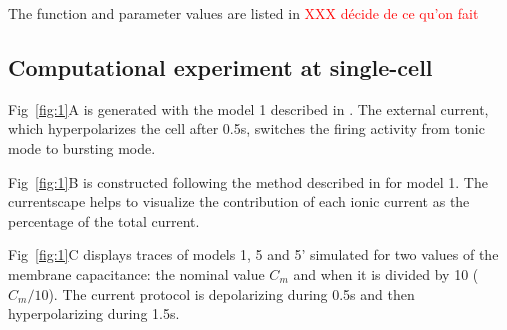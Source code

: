 The function and parameter values are listed in \textcolor{red}{XXX décide de ce qu'on fait}


\subsection{Computational experiment at single-cell}
Fig~\ref{fig:1}A is generated with the model 1 described in \citep{drion_switchable_2018}. The external current, which hyperpolarizes the cell after 0.5s, switches the firing activity from tonic mode to bursting mode. 

Fig~\ref{fig:1}B is constructed following the method described in \citep{alonso_visualization_2019} for model 1. The currentscape helps to visualize the contribution of each ionic current as the percentage of the total current.

Fig~\ref{fig:1}C displays traces of models 1, 5 and 5' simulated for two values of the membrane capacitance: the nominal value $C_m$ and when it is divided by 10 ($C_m/10$).  The current protocol is depolarizing during 0.5s and then hyperpolarizing during 1.5s.  

